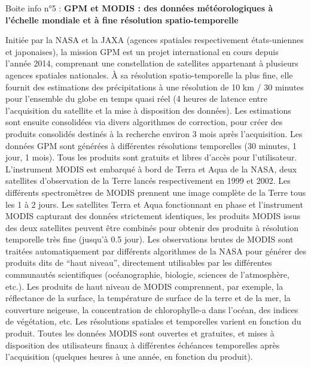 \documentclass[12pt,twoside]{reedthesis}
\begin{document}
\begin{lightcyanbox}
\begin{center}
Boite info n°5 : \textbf{GPM et MODIS : des données météorologiques à l'échelle mondiale et à fine résolution spatio-temporelle}

\end{center}
Initiée par la NASA et la JAXA (agences spatiales respectivement états-uniennes et japonaises), la mission GPM est un projet international en cours depuis l'année 2014, comprenant une constellation de satellites appartenant à plusieurs agences spatiales nationales. À sa résolution spatio-temporelle la plus fine, elle fournit des estimations des précipitations à une résolution de 10 km / 30 minutes pour l'ensemble du globe en temps quasi réel (4 heures de latence entre l'acquisition du satellite et la mise à disposition des données). Les estimations sont ensuite consolidées via divers algorithmes de correction, pour créer des produits consolidés destinés à la recherche environ 3 mois après l'acquisition. Les données GPM sont générées à différentes résolutions temporelles (30 minutes, 1 jour, 1 mois). Tous les produits sont gratuits et libres d'accès pour l'utilisateur.\\

L'instrument MODIS est embarqué à bord de Terra et Aqua de la NASA, deux satellites d'observation de la Terre lancés respectivement en 1999 et 2002. Les différents spectromètres de MODIS prennent une image complète de la Terre tous les 1 à 2 jours. Les satellites Terra et Aqua fonctionnant en phase et l'instrument MODIS capturant des données strictement identiques, les produits MODIS issus des deux satellites peuvent être combinés pour obtenir des produits à résolution temporelle très fine (jusqu'à 0.5 jour). Les observations brutes de MODIS sont traitées automatiquement par différents algorithmes de la NASA pour générer des produits dits de ``haut niveau'', directement utilisables par les différentes communautés scientifiques (océanographie, biologie, sciences de l'atmosphère, etc.). Les produits de haut niveau de MODIS comprennent, par exemple, la réflectance de la surface, la température de surface de la terre et de la mer, la couverture neigeuse, la concentration de chlorophylle-a dans l'océan, des indices de végétation, etc. Les résolutions spatiales et temporelles varient en fonction du produit. Toutes les données MODIS sont ouvertes et gratuites, et mises à disposition des utilisateurs finaux à différentes échéances temporelles après l'acquisition (quelques heures à une année, en fonction du produit).\\

\end{lightcyanbox}
\end{document}
